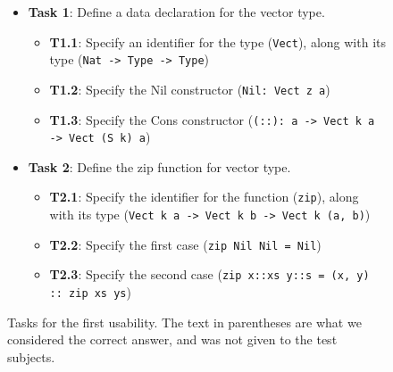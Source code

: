 \begin{figure}
\centering
\begin{itemize}
	\item \textbf{Task 1}: Define a data declaration for the vector type.
	\begin{itemize}
		\item \textbf{T1.1}: Specify an identifier for the type (\texttt{Vect}), along with its type (\texttt{Nat -> Type -> Type})
		\item \textbf{T1.2}: Specify the Nil constructor (\texttt{Nil: Vect z a})
		\item \textbf{T1.3}: Specify the Cons constructor (\texttt{(::): a -> Vect k a -> Vect (S k) a})
	\end{itemize}
	\item \textbf{Task 2}: Define the zip function for vector type.
	\begin{itemize}
		\item \textbf{T2.1}: Specify the identifier for the function (\texttt{zip}), along with its type (\texttt{Vect k a -> Vect k b -> Vect k (a, b)})
		\item \textbf{T2.2}: Specify the first case (\texttt{zip Nil Nil = Nil})
		\item \textbf{T2.3}: Specify the second case (\texttt{zip x::xs y::s = (x, y) :: zip xs ys})
	\end{itemize}
\end{itemize}
\caption{Tasks for the first usability. The text in parentheses are what we considered the correct answer, and was not given to the test subjects.}
\label{figure:first_tasks}
\end{figure}

